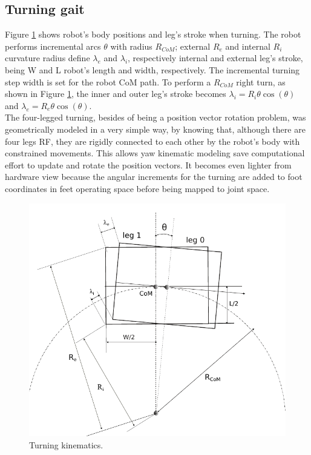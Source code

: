 \subsection{Turning gait}
\label{subs:turningGait}
Figure \ref{fig:diagramafazendocurva} shows robot's body positions and leg's stroke when turning. The robot performs incremental arcs $\theta$ with radius $R_{CoM}$; external $R_e$ and internal $R_i$ curvature radius define $\lambda_e$ and $\lambda_i$, respectively internal and external leg's stroke, being W and L robot's length and width, respectively. 
The incremental turning step width is set for the robot CoM path. To perform a $R_{CoM}$ right turn, as shown in Figure \ref{fig:diagramafazendocurva}, the inner and outer leg's stroke becomes $\lambda_i=R_i\theta\cos(\theta)$ and $\lambda_e=R_e\theta\cos(\theta)$.\\The four-legged turning, besides of being a position vector rotation problem, was geometrically modeled in a very simple way, by knowing that, although there are four legs RF, they are rigidly connected to each other by the robot's body with constrained movements. This allows yaw kinematic modeling save computational effort to update and rotate the position vectors. It becomes even lighter from hardware view because the angular increments for the turning are added to foot coordinates in feet operating space before being mapped to joint space.
\begin{figure}
	\centering
	\includegraphics[scale=0.5]{./Figuras/DiagramaFazendoCurva_}
	\caption{Turning kinematics.}
	\label{fig:diagramafazendocurva}
\end{figure}
